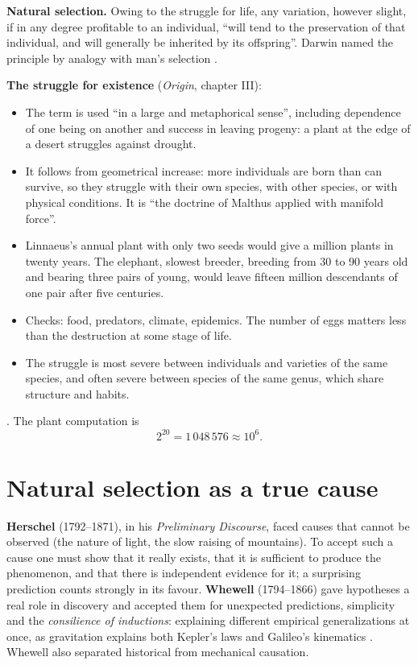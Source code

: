 \textbf{Natural selection.} Owing to the
struggle for life, any variation, however
slight, if in any degree profitable to an
individual, ``will tend to the preservation
of that individual, and will generally be
inherited by its offspring''. Darwin named
the principle by analogy with man's
selection
\cite[Chapter III]{darwin2008origin}.

\textbf{The struggle for existence}
(\emph{Origin}, chapter III):
\begin{itemize}
\item The term is used ``in a large and
metaphorical sense'', including dependence
of one being on another and success in
leaving progeny: a plant at the edge of a
desert struggles against drought.
\item It follows from geometrical increase:
more individuals are born than can
survive, so they struggle with their own
species, with other species, or with
physical conditions. It is ``the doctrine
of Malthus applied with manifold force''.
\item Linnaeus's annual plant with only two
seeds would give a million plants in
twenty years. The elephant, slowest
breeder, breeding from 30 to 90 years old
and bearing three pairs of young, would
leave fifteen million descendants of one
pair after five centuries.
\item Checks: food, predators, climate,
epidemics. The number of eggs matters less
than the destruction at some stage of
life.
\item The struggle is most severe between
individuals and varieties of the same
species, and often severe between species
of the same genus, which share structure
and habits.
\end{itemize}
\cite[Chapter III]{darwin2008origin}.
The plant computation is
$$
2^{20} = 1\,048\,576 \approx 10^{6}.
$$

\section{Natural selection as a true cause}
\label{section-vera-causa}

\textbf{Herschel} (1792--1871), in his
\emph{Preliminary Discourse}, faced causes
that cannot be observed (the nature of
light, the slow raising of mountains). To
accept such a cause one must show that it
really exists, that it is sufficient to
produce the phenomenon, and that there is
independent evidence for it; a surprising
prediction counts strongly in its favour.
\textbf{Whewell} (1794--1866) gave
hypotheses a real role in discovery and
accepted them for unexpected predictions,
simplicity and the \emph{consilience of
inductions}: explaining different empirical
generalizations at once, as gravitation
explains both Kepler's laws and Galileo's
kinematics \cite{guillaumin-vera-causa}.
Whewell also separated historical from
mechanical causation.

